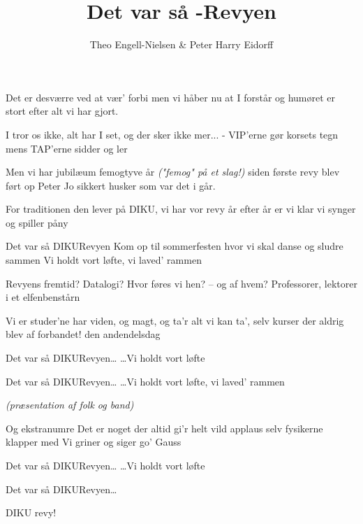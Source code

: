 \documentclass[11pt]{article}
\title{Det var så \sc{DIKU}-Revyen}
\author{Theo Engell-Nielsen \& Peter Harry Eidorff}
\begin{document}
\begin{song}

Det er desværre
ved at vær' forbi
men vi håber nu at I forstår
og humøret er stort
efter alt vi har gjort.

I tror os ikke,
alt har I set, og der sker ikke mer...
- VIP'erne gør korsets tegn
mens TAP'erne sidder og ler

Men vi har jubilæum
femogtyve år \emph{("femog" på et slag!)}
siden første revy blev ført op
Peter Jo sikkert husker
som var det i går.

For traditionen
den lever på DIKU, vi har vor revy
år efter år er vi klar
vi synger og spiller påny

  Det var så DIKURevyen
  Kom op til sommerfesten
  hvor vi skal danse
  og sludre sammen
  Vi holdt vort løfte, vi laved' rammen

Revyens fremtid?
Datalogi?
Hvor føres vi hen? -- og af hvem?
Professorer, lektorer
i et elfenbenstårn

Vi er studer'ne
har viden, og magt, og ta'r alt vi kan ta',
selv kurser der aldrig blev af
forbandet! den andendelsdag

  Det var så DIKURevyen\ldots
  \ldots{}Vi holdt vort løfte

  Det var så DIKURevyen\ldots
  \ldots{}Vi holdt vort løfte, vi laved' rammen

\emph{(præsentation af folk og band)}

Og ekstranumre
Det er noget der altid gi'r helt vild applaus
selv fysikerne klapper med
Vi griner og siger go' Gauss

  Det var så DIKURevyen\ldots
  \ldots{}Vi holdt vort løfte

  Det var så DIKURevyen\ldots

DIKU revy!

\end{song}
\end{document}
